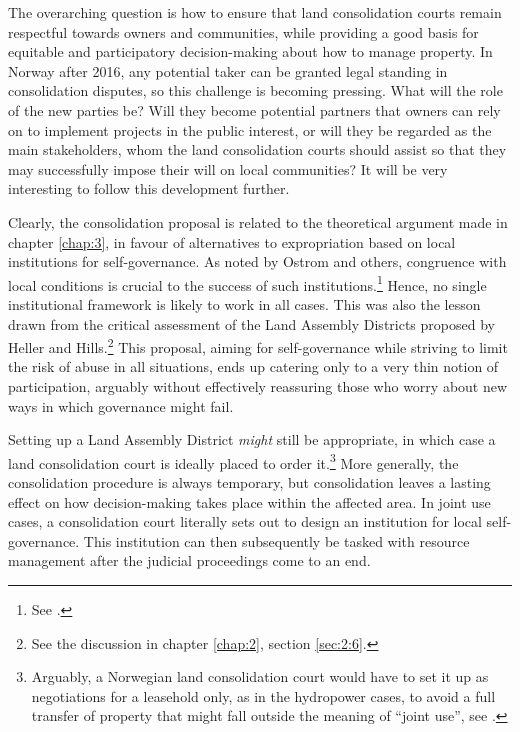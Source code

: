 The overarching question is how to ensure that land consolidation courts remain respectful towards owners and communities, while providing a good basis for equitable and participatory decision-making about how to manage property. In Norway after 2016, any potential taker can be granted legal standing in consolidation disputes, so this challenge is becoming pressing. What will the role of the new parties be? Will they become potential partners that owners can rely on to implement projects in the public interest, or will they be regarded as the main stakeholders, whom the land consolidation courts should assist so that they may successfully impose their will on local communities? It will be very interesting to follow this development further.


Clearly, the consolidation proposal is related to the theoretical argument made in chapter \ref{chap:3}, in favour of alternatives to expropriation based on local institutions for self-governance. As noted by Ostrom and others, congruence with local conditions is crucial to the success of such institutions.\footnote{See \cite[92]{ostrom90}.} Hence, no single institutional framework is likely to work in all cases. This was also the lesson drawn from the critical assessment of the Land Assembly Districts proposed by Heller and Hills.\footnote{See the discussion in chapter \ref{chap:2}, section \ref{sec:2:6}.} This proposal, aiming for self-governance while striving to limit the risk of abuse in all situations, ends up catering only to a very thin notion of participation, arguably without effectively reassuring those who worry about new ways in which governance might fail.

Setting up a Land Assembly District {\it might} still be appropriate, in which case a land consolidation court is ideally placed to order it.\footnote{Arguably, a Norwegian land consolidation court would have to set it up as negotiations for a leasehold only, as in the hydropower cases, to avoid a full transfer of property that might fall outside the meaning of ``joint use'', see \cite{holen95}.} More generally, the consolidation procedure is always temporary, but consolidation leaves a lasting effect on how decision-making takes place within the affected area. In joint use cases, a consolidation court literally sets out to design an institution for local self-governance. This institution can then subsequently be tasked with resource management after the judicial proceedings come to an end.

